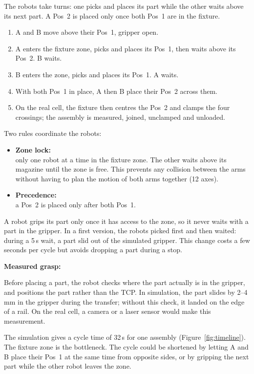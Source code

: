 \documentclass[11pt,a4paper]{article}
\begin{document}
The robots take turns: one picks and places its part while the other waits above its next part.
A Pos~2 is placed only once both Pos~1 are in the fixture.
\begin{enumerate}
  \item A and B move above their Pos~1, gripper open.
  \item A enters the fixture zone, picks and places its Pos~1, then waits above its Pos~2. B
        waits.
  \item B enters the zone, picks and places its Pos~1. A waits.
  \item With both Pos~1 in place, A then B place their Pos~2 across them.
  \item On the real cell, the fixture then centres the Pos~2 and clamps the four crossings; the
        assembly is measured, joined, unclamped and unloaded.
\end{enumerate}

Two rules coordinate the robots:
\begin{itemize}
  \item \textbf{Zone lock:}\\ only one robot at a time in the fixture zone. The other waits above
        its magazine until the zone is free. This prevents any collision between the arms without
        having to plan the motion of both arms together (12 axes).
  \item \textbf{Precedence:}\\ a Pos~2 is placed only after both Pos~1.
\end{itemize}

A robot grips its part only once it has access to the zone, so it never waits with a part in the
gripper. In a first version, the robots picked first and then waited: during a 5\,s wait, a part
slid out of the simulated gripper. This change costs a few seconds per cycle but avoids dropping a
part during a stop.

\textbf{Measured grasp:}

Before placing a part, the robot checks where the part actually is in the gripper, and positions
the part rather than the TCP. In simulation, the part slides by 2--4\,mm in the gripper during the
transfer; without this check, it landed on the edge of a rail. On the real cell, a camera or a
laser sensor would make this measurement.

The simulation gives a cycle time of 32\,s for one assembly (Figure~\ref{fig:timeline}). The
fixture zone is the bottleneck. The cycle could be shortened by letting A and B place their Pos~1
at the same time from opposite sides, or by gripping the next part while the other robot leaves
the zone.
\end{document}
